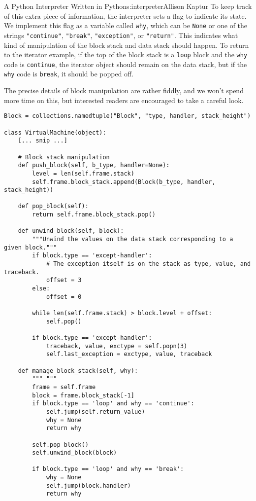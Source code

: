 \begin{aosachapter}{A Python Interpreter Written in Python}{s:interpreter}{Allison Kaptur}
To keep track of this extra piece of information, the interpreter sets a
flag to indicate its state. We implement this flag as a variable called
\texttt{why}, which can be \texttt{None} or one of the strings
\texttt{"continue"}, \texttt{"break"}, \texttt{"exception"}, or
\texttt{"return"}. This indicates what kind of manipulation of the block
stack and data stack should happen. To return to the iterator example,
if the top of the block stack is a \texttt{loop} block and the
\texttt{why} code is \texttt{continue}, the iterator object should
remain on the data stack, but if the \texttt{why} code is
\texttt{break}, it should be popped off.

The precise details of block manipulation are rather fiddly, and we
won't spend more time on this, but interested readers are encouraged to
take a careful look.

\begin{verbatim}
Block = collections.namedtuple("Block", "type, handler, stack_height")

class VirtualMachine(object):
    [... snip ...]

    # Block stack manipulation
    def push_block(self, b_type, handler=None):
        level = len(self.frame.stack)
        self.frame.block_stack.append(Block(b_type, handler, stack_height))

    def pop_block(self):
        return self.frame.block_stack.pop()

    def unwind_block(self, block):
        """Unwind the values on the data stack corresponding to a given block."""
        if block.type == 'except-handler':
            # The exception itself is on the stack as type, value, and traceback.
            offset = 3  
        else:
            offset = 0

        while len(self.frame.stack) > block.level + offset:
            self.pop()

        if block.type == 'except-handler':
            traceback, value, exctype = self.popn(3)
            self.last_exception = exctype, value, traceback

    def manage_block_stack(self, why):
        """ """
        frame = self.frame
        block = frame.block_stack[-1]
        if block.type == 'loop' and why == 'continue':
            self.jump(self.return_value)
            why = None
            return why

        self.pop_block()
        self.unwind_block(block)

        if block.type == 'loop' and why == 'break':
            why = None
            self.jump(block.handler)
            return why


\end{verbatim}
\end{aosachapter}
